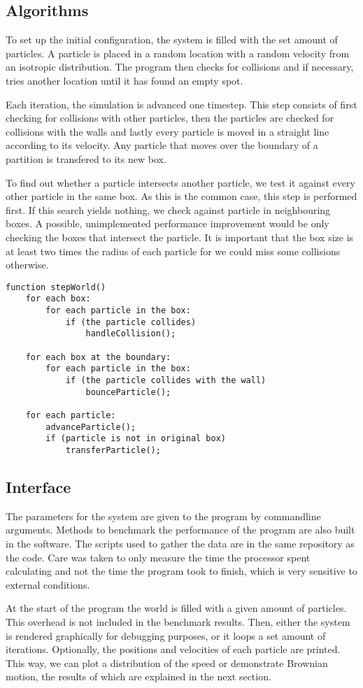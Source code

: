 \subsection{Algorithms}

To set up the initial configuration, the system is filled with the set amount 
of particles. A particle is placed in a random location with a random velocity 
from an isotropic distribution. The program then checks for collisions and if 
necessary, tries another location until it has found an empty spot.

Each iteration, the simulation is advanced one timestep. This step consists of 
first checking for collisions with other particles, then the particles are 
checked for collisions with the walls and lastly every particle is moved in a 
straight line according to its velocity. Any particle that moves over the 
boundary of a partition is transfered to its new box.

To find out whether a particle intersects another particle, we test it against 
every other particle in the same box. As this is the common case, this step is 
performed first. If this search yields nothing, we check against particle in 
neighbouring boxes. A possible, unimplemented performance improvement would be 
only checking the boxes that intersect the particle. It is important that the 
box size is at least two times the radius of each particle for we could miss 
some collisions otherwise.

\begin{lstlisting}
function stepWorld()
	for each box:
		for each particle in the box:
			if (the particle collides)
				handleCollision();
	
	for each box at the boundary:
		for each particle in the box:
			if (the particle collides with the wall)
				bounceParticle();
	
	for each particle:
		advanceParticle();
		if (particle is not in original box)
			transferParticle();
\end{lstlisting}

\subsection{Interface}
The parameters for the system are given to the program by commandline 
arguments. Methods to benchmark the performance of the program are also built 
in the software. The scripts used to gather the data are in the same repository 
as the code. Care was taken to only measure the time the processor spent 
calculating and not the time the program took to finish, which is very 
sensitive to external conditions.

At the start of the program the world is filled with a given amount of 
particles. This overhead is not included in the benchmark results. Then, either 
the system is rendered graphically for debugging purposes, or it loops a set 
amount of iterations.  Optionally, the positions and velocities of each 
particle are printed. This way, we can plot a distribution of the speed or 
demonstrate Brownian motion, the results of which are explained in the next 
section.


